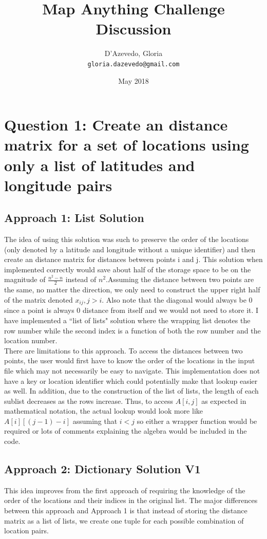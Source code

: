 \documentclass{article}
\title{Map Anything Challenge Discussion}
\author{
  D'Azevedo, Gloria\\
  \texttt{gloria.dazevedo@gmail.com}\\
}
\date{May 2018}
\begin{document}
\maketitle

\section{Question 1: Create an distance matrix for a set of locations using only a list of latitudes and longitude pairs}
\subsection{Approach 1: List Solution}
The idea of using this solution was such to preserve the order of the locations (only denoted by a latitude and longitude without a unique identifier) and then create an distance matrix for distances between points i and j.  This solution when implemented correctly would save about half of the storage space to be on the magnitude of $\frac{n^2-n}{2}$ instead of $n^2$.Assuming the distance between two points are the same, no matter the direction, we only need to construct
the upper right half of the matrix denoted $x_{ij}, j>i$.  Also note that the diagonal would always be 0 since a point is always 0 distance from itself and we would not need to store it.  I have implemented a ``list of lists" solution where the wrapping list denotes the row number while the second index is a function of both the row number and the location number.  \\

There are limitations to this approach.  To access the distances between two points, the user would first have to know the order of the locations in the input file which may not necessarily be easy to navigate.  This implementation does not have a key or location identifier which could potentially make that lookup easier as well.  In addition, due to the construction of the list of lists, the length of each sublist decreases as the rows increase.  Thus, to access $A[i,j]$ as expected in mathematical notation, the actual lookup would look more like $A[i][(j-1)-i]$ assuming that $i<j$ so either a wrapper function would be required or lots of comments explaining the algebra would be included in the code.\\

\subsection{Approach 2: Dictionary Solution V1}
This idea improves from the first approach of requiring the knowledge of the order of the locations and their indices in the original list.  The major differences between this approach and Approach 1 is that instead of storing the distance matrix as a list of lists, we create one tuple for each possible combination of location pairs. \\
\end{document}
